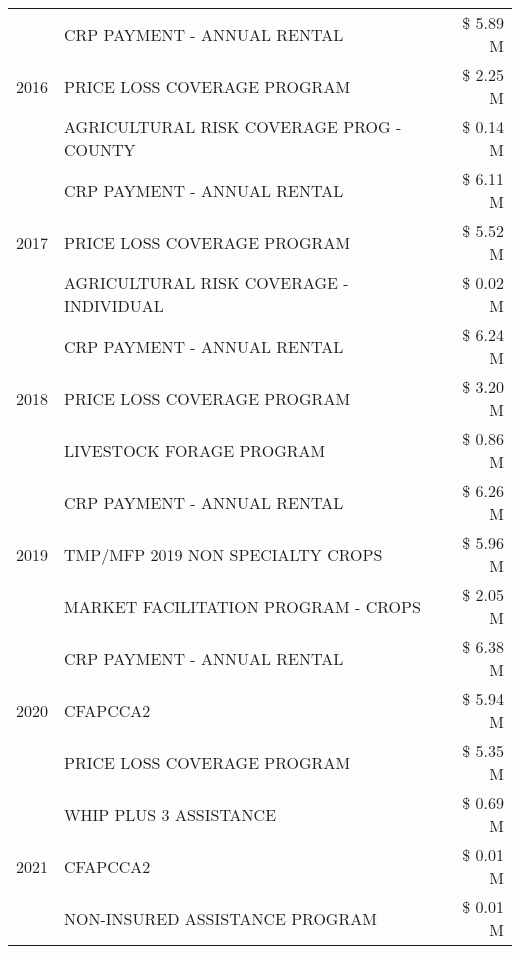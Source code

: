 \begin{tabular}{llr}
\multirow[t]{3}{*}{2016} & CRP PAYMENT - ANNUAL RENTAL                   & \$ 5.89 M \\
 & PRICE LOSS COVERAGE PROGRAM                   & \$ 2.25 M \\
 & AGRICULTURAL RISK COVERAGE PROG - COUNTY      & \$ 0.14 M \\
\cline{1-3}
\multirow[t]{3}{*}{2017} & CRP PAYMENT - ANNUAL RENTAL & \$ 6.11 M \\
 & PRICE LOSS COVERAGE PROGRAM & \$ 5.52 M \\
 & AGRICULTURAL RISK COVERAGE - INDIVIDUAL & \$ 0.02 M \\
\cline{1-3}
\multirow[t]{3}{*}{2018} & CRP PAYMENT - ANNUAL RENTAL & \$ 6.24 M \\
 & PRICE LOSS COVERAGE PROGRAM & \$ 3.20 M \\
 & LIVESTOCK FORAGE PROGRAM & \$ 0.86 M \\
\cline{1-3}
\multirow[t]{3}{*}{2019} & CRP PAYMENT - ANNUAL RENTAL & \$ 6.26 M \\
 & TMP/MFP 2019 NON SPECIALTY CROPS & \$ 5.96 M \\
 & MARKET FACILITATION PROGRAM - CROPS & \$ 2.05 M \\
\cline{1-3}
\multirow[t]{3}{*}{2020} & CRP PAYMENT - ANNUAL RENTAL & \$ 6.38 M \\
 & CFAPCCA2 & \$ 5.94 M \\
 & PRICE LOSS COVERAGE PROGRAM & \$ 5.35 M \\
\cline{1-3}
\multirow[t]{3}{*}{2021} & WHIP PLUS 3 ASSISTANCE & \$ 0.69 M \\
 & CFAPCCA2 & \$ 0.01 M \\
 & NON-INSURED ASSISTANCE PROGRAM & \$ 0.01 M \\
\cline{1-3}
\bottomrule
\end{tabular}
